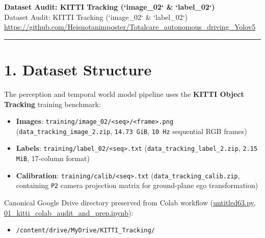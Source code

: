 \documentclass[10.5pt,a4paper]{article}
\begin{document}
\begin{center}
{\LARGE\bfseries Dataset Audit: KITTI Tracking (`image\_02` \& `label\_02`)}\\[6pt]
{\normalsize\color{gray} Dataset Audit: KITTI Tracking (`image\_02` \& `label\_02`)}\\[4pt]
{\small\href{https://github.com/Heisnotanimposter/Totalcare_autonomous_driving_Yolov5}{https://github.com/Heisnotanimposter/Totalcare\_autonomous\_driving\_Yolov5}}
\end{center}
\vspace{4pt}
\hrule
\vspace{8pt}

\section{1. Dataset Structure}

The perception and temporal world model pipeline uses the \textbf{KITTI Object Tracking} training benchmark:

\begin{itemize}[leftmargin=1.5em,itemsep=2pt]
\item \textbf{Images}: \texttt{training/\allowbreak{}image\_\allowbreak{}02/\allowbreak{}<seq>/\allowbreak{}<frame>.\allowbreak{}png} (\texttt{data\_\allowbreak{}tracking\_\allowbreak{}image\_\allowbreak{}2.\allowbreak{}zip}, \texttt{14.\allowbreak{}73 GiB}, \texttt{10 Hz} sequential RGB frames)
\item \textbf{Labels}: \texttt{training/\allowbreak{}label\_\allowbreak{}02/\allowbreak{}<seq>.\allowbreak{}txt} (\texttt{data\_\allowbreak{}tracking\_\allowbreak{}label\_\allowbreak{}2.\allowbreak{}zip}, \texttt{2.\allowbreak{}15 MiB}, 17-column format)
\item \textbf{Calibration}: \texttt{training/\allowbreak{}calib/\allowbreak{}<seq>.\allowbreak{}txt} (\texttt{data\_\allowbreak{}tracking\_\allowbreak{}calib.\allowbreak{}zip}, containing \texttt{P2} camera projection matrix for ground-plane ego transformation)
\end{itemize}

Canonical Google Drive directory preserved from Colab workflow (\href{https://github.com/Heisnotanimposter/Totalcare\_autonomous\_driving\_Yolov5/blob/main/untitled63.py}{untitled63.py}, \href{https://github.com/Heisnotanimposter/Totalcare\_autonomous\_driving\_Yolov5/blob/main/colab/01\_kitti\_colab\_audit\_and\_prep.ipynb}{01\_kitti\_colab\_audit\_and\_prep.ipynb}):

\begin{itemize}[leftmargin=1.5em,itemsep=2pt]
\item \texttt{/\allowbreak{}content/\allowbreak{}drive/\allowbreak{}MyDrive/\allowbreak{}KITTI\_\allowbreak{}Tracking/\allowbreak{}}
\end{itemize}
\end{document}
